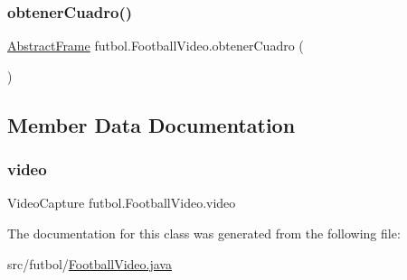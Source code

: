 \subsubsection{\texorpdfstring{obtener\+Cuadro()}{obtenerCuadro()}}
{\footnotesize\ttfamily \hyperlink{classfutbol_1_1_abstract_frame}{Abstract\+Frame} futbol.\+Football\+Video.\+obtener\+Cuadro (\begin{DoxyParamCaption}{ }\end{DoxyParamCaption})}



\subsection{Member Data Documentation}
\hypertarget{classfutbol_1_1_football_video_aee6e3af1ca6ab8dc215032f0f8c92ba1}{}\label{classfutbol_1_1_football_video_aee6e3af1ca6ab8dc215032f0f8c92ba1} 
\subsubsection{\texorpdfstring{video}{video}}
{\footnotesize\ttfamily Video\+Capture futbol.\+Football\+Video.\+video\hspace{0.3cm}{\ttfamily [private]}}



The documentation for this class was generated from the following file\+:\begin{DoxyCompactItemize}
\item 
src/futbol/\hyperlink{_football_video_8java}{Football\+Video.\+java}\end{DoxyCompactItemize}
